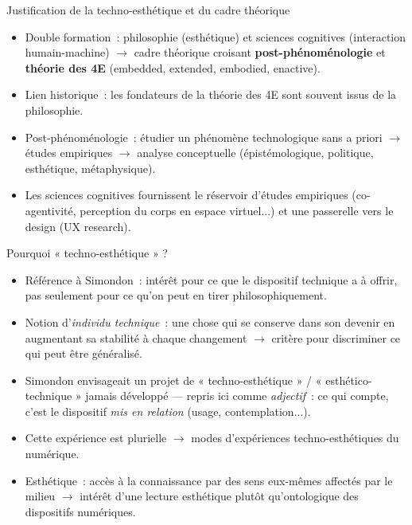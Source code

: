\documentclass[xcolor=monochrome,11pt]{beamer}
\begin{document}
\begin{frame}{Justification de la techno-esthétique et du cadre théorique}
  \footnotesize
  \begin{itemize}
    \item Double formation~: philosophie (esthétique) et sciences
      cognitives (interaction humain-machine) $\rightarrow$ cadre
      théorique croisant \textbf{post-phénoménologie} et
      \textbf{théorie des 4E} (embedded, extended, embodied, enactive).
    \item Lien historique~: les fondateurs de la théorie des 4E sont
      souvent issus de la philosophie.
    \item Post-phénoménologie~: étudier un phénomène technologique sans
      a priori $\rightarrow$ études empiriques $\rightarrow$ analyse
      conceptuelle (épistémologique, politique, esthétique, métaphysique).
    \item Les sciences cognitives fournissent le réservoir d'études
      empiriques (co-agentivité, perception du corps en espace virtuel...)
      et une passerelle vers le design (UX research).
  \end{itemize}
\end{frame}

\begin{frame}{Pourquoi « techno-esthétique » ?}
  \footnotesize
  \begin{itemize}
    \item Référence à Simondon~: intérêt pour ce que le dispositif
      technique a à offrir, pas seulement pour ce qu'on peut en tirer
      philosophiquement.
    \item Notion d'\emph{individu technique}~: une chose qui se conserve
      dans son devenir en augmentant sa stabilité à chaque changement
      $\rightarrow$ critère pour discriminer ce qui peut être généralisé.
    \item Simondon envisageait un projet de « techno-esthétique » /
      « esthético-technique » jamais développé --- repris ici comme
      \emph{adjectif}~: ce qui compte, c'est le dispositif \emph{mis en
      relation} (usage, contemplation...).
    \item Cette expérience est plurielle $\rightarrow$ modes
      d'expériences techno-esthétiques du numérique.
    \item Esthétique~: accès à la connaissance par des sens eux-mêmes
      affectés par le milieu $\rightarrow$ intérêt d'une lecture esthétique
      plutôt qu'ontologique des dispositifs numériques.
  \end{itemize}
\end{frame}
\end{document}
